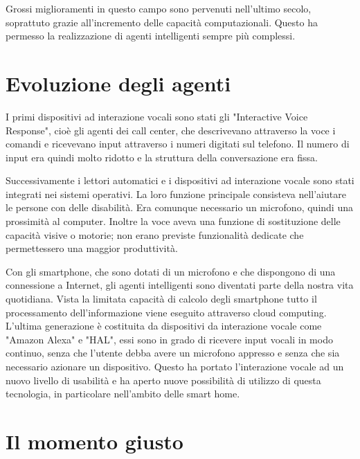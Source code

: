 \documentclass[twoside]{supsistudent}
\begin{document}
Grossi miglioramenti in questo campo sono pervenuti nell'ultimo secolo, soprattuto grazie all'incremento delle capacità computazionali. Questo ha permesso la realizzazione di agenti intelligenti sempre più complessi.

\section{Evoluzione degli agenti}

I primi dispositivi ad interazione vocali sono stati gli "Interactive Voice Response", cioè gli agenti dei call center, che descrivevano attraverso la voce i comandi e ricevevano input attraverso i numeri digitati sul telefono. Il numero di input era quindi molto ridotto e la struttura della conversazione era fissa.

Successivamente i lettori automatici e i dispositivi ad interazione vocale sono stati integrati nei sistemi operativi. La loro funzione principale consisteva nell'aiutare le persone con delle disabilità. Era comunque necessario un microfono, quindi una prossimità al computer. Inoltre la voce aveva una funzione di sostituzione delle capacità visive o motorie; non erano previste funzionalità dedicate che permettessero una maggior produttività.

Con gli smartphone, che sono dotati di un microfono e che dispongono di una connessione a Internet, gli agenti intelligenti sono diventati parte della nostra vita quotidiana. Vista la limitata capacità di calcolo degli smartphone tutto il processamento dell'informazione viene eseguito attraverso cloud computing.\\
L'ultima generazione è costituita da dispositivi da interazione vocale come "Amazon Alexa" e "HAL", essi sono in grado di ricevere input vocali in modo continuo, senza che l'utente debba avere un microfono appresso e senza che sia necessario azionare un dispositivo. Questo ha portato l'interazione vocale ad un nuovo livello di usabilità e ha aperto nuove possibilità di utilizzo di questa tecnologia, in particolare nell'ambito delle smart home.\cite{alexa}\cite{HAL}

\section{Il momento giusto}
\end{document}
